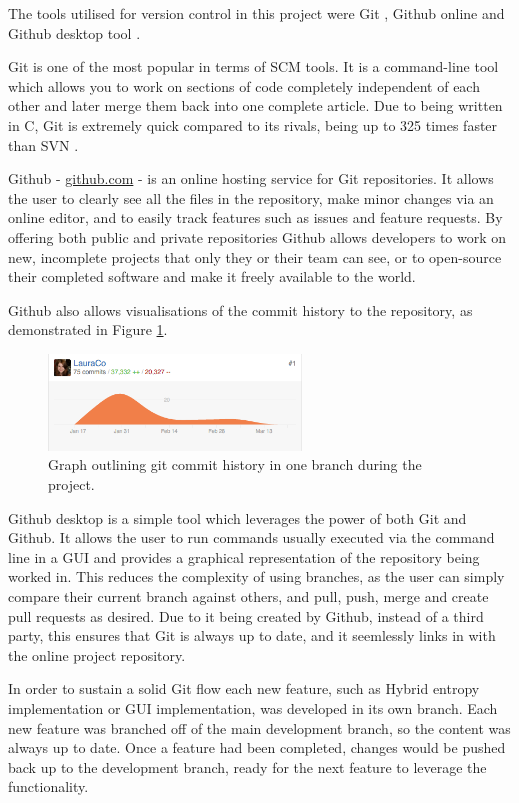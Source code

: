 The tools utilised for version control in this project were Git \cite{2014gits}, Github online \cite{github} and Github desktop tool \cite{github_desktop}.

Git \cite{2014gits} is one of the most popular in terms of \acrfull{SCM} tools. It is a command-line tool which allows you to work on sections of code completely independent of each other and later merge them back into one complete article. Due to being written in C, Git is extremely quick compared to its rivals, being up to 325 times faster than \acrfull{SVN} \cite{About_Git}.

Github \cite{github} - \url{github.com} - is an online hosting service for Git repositories. It allows the user to clearly see all the files in the repository, make minor changes via an online editor, and to easily track features such as issues and feature requests. By offering both public and private repositories Github allows developers to work on new, incomplete projects that only they or their team can see, or to open-source their completed software and make it freely available to the world.

Github also allows visualisations of the commit history to the repository, as demonstrated in Figure \ref{fig:git-graph}.

\begin{figure}[H]
  \centering
  \includegraphics[width=0.6\textwidth]{Chapter2/tools/git_graph.png}
  \caption{Graph outlining git commit history in one branch during the project.}
  \label{fig:git-graph}
\end{figure}

Github desktop \cite{github_desktop} is a simple tool which leverages the power of both Git and Github. It allows the user to run commands usually executed via the command line in a \acrshort{GUI} and provides a graphical representation of the repository being worked in. This reduces the complexity of using branches, as the user can simply compare their current branch against others, and pull, push, merge and create pull requests as desired. Due to it being created by Github, instead of a third party, this ensures that Git is always up to date, and it seemlessly links in with the online project repository.

In order to sustain a solid Git flow each new feature, such as Hybrid entropy implementation or \acrshort{GUI} implementation, was developed in its own branch. Each new feature was branched off of the  main development branch, so the content was always up to date. Once a feature had been completed, changes would be pushed back up to the development branch, ready for the next feature to leverage the functionality.
